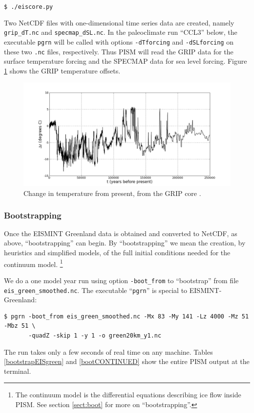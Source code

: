 \documentclass[11pt,final]{amsart}
\begin{document}
\verb|$ ./eiscore.py|

\noindent Two NetCDF files with one-dimensional time series data are created, namely \verb|grip_dT.nc| and \verb|specmap_dSL.nc|.  In the paleoclimate run ``CCL3'' below, the executable \verb|pgrn| will be called with options \verb|-dTforcing| and \verb|-dSLforcing| on these two \verb|.nc| files, respectively.  Thus PISM will read the GRIP data \cite{Dansgaardetal1993} for the surface temperature forcing and the SPECMAP data \cite{Imbrieetal1984} for sea level forcing.  Figure \ref{fig:gripDeltaT} shows the GRIP temperature offsets.

\begin{figure}[ht]
\includegraphics[width=5.6in,keepaspectratio=true]{figs/gripDeltaT}
\caption{Change in temperature from present, from the GRIP core \cite{JohnsonetalGRIP}.}
\label{fig:gripDeltaT}
\end{figure}


\subsubsection*{Bootstrapping}  \label{sect:green-bootstrapping}  Once the EISMINT Greenland data is obtained and converted to NetCDF, as above, ``bootstrapping'' can begin.  By ``bootstrapping'' we mean the creation, by heuristics and simplified models, of the full initial conditions needed for the continuum model.  \footnote{The continuum model is the differential equations describing ice flow inside PISM.  See section \ref{sect:boot} for more on ``bootstrapping''.}

We do a one model year run using option \verb|-boot_from| to ``bootstrap'' from file \verb|eis_green_smoothed.nc|.  The executable ``\verb|pgrn|'' is special to EISMINT-Greenland:
\begin{verbatim}
$ pgrn -boot_from eis_green_smoothed.nc -Mx 83 -My 141 -Lz 4000 -Mz 51 -Mbz 51 \
       -quadZ -skip 1 -y 1 -o green20km_y1.nc
\end{verbatim}
\noindent The run takes only a few seconds of real time on any machine.  Tables \ref{bootstrapEISgreen} and \ref{bootCONTINUED} show the entire PISM output at the terminal.
\end{document}
